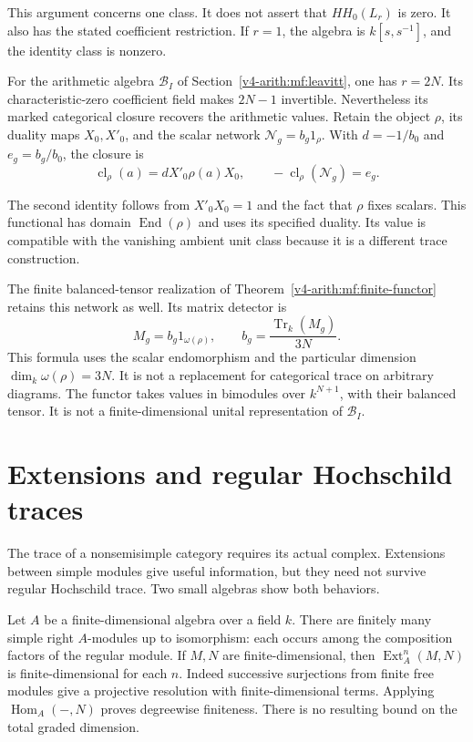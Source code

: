 This argument concerns one class. It does not assert that $HH_0(L_r)$ is
zero. It also has the stated coefficient restriction. If $r=1$, the algebra
is $k[s,s^{-1}]$, and the identity class is nonzero.

For the arithmetic algebra $\mathcal B_I$ of
Section~\ref{v4-arith:mf:leavitt}, one has $r=2N$. Its characteristic-zero
coefficient field makes $2N-1$ invertible. Nevertheless its marked
categorical closure recovers the arithmetic values. Retain the object
$\rho$, its duality maps $X_0,X'_0$, and the scalar network $\mathcal
N_g=b_g1_\rho$. With $d=-1/b_0$ and $e_g=b_g/b_0$, the closure is
\[
 \operatorname{cl}_\rho(a)=dX'_0\rho(a)X_0,\qquad
 -\operatorname{cl}_\rho(\mathcal N_g)=e_g.
\]

The second identity follows from $X'_0X_0=1$ and the fact that $\rho$ fixes
scalars. This functional has domain $\operatorname{End}(\rho)$ and uses its
specified duality. Its value is compatible with the vanishing ambient unit
class because it is a different trace construction.

The finite balanced-tensor realization of
Theorem~\ref{v4-arith:mf:finite-functor} retains this network as well. Its
matrix detector is
\[
 M_g=b_g1_{\omega(\rho)},\qquad
 b_g=\frac{\operatorname{Tr}_k(M_g)}{3N}.
\]
This formula uses the scalar endomorphism and the particular dimension
$\dim_k\omega(\rho)=3N$. It is not a replacement for categorical trace on
arbitrary diagrams. The functor takes values in bimodules over $k^{N+1}$,
with their balanced tensor. It is not a finite-dimensional unital
representation of $\mathcal B_I$.

\section{Extensions and regular Hochschild traces}

The trace of a nonsemisimple category requires its actual complex.
Extensions between simple modules give useful information, but they need not
survive regular Hochschild trace. Two small algebras show both behaviors.

Let $A$ be a finite-dimensional algebra over a field $k$. There are finitely
many simple right $A$-modules up to isomorphism: each occurs among the
composition factors of the regular module. If $M,N$ are finite-dimensional,
then $\operatorname{Ext}^n_A(M,N)$ is finite-dimensional for each $n$.
Indeed successive surjections from finite free modules give a projective
resolution with finite-dimensional terms. Applying
$\operatorname{Hom}_A(-,N)$ proves degreewise finiteness. There is no
resulting bound on the total graded dimension.

